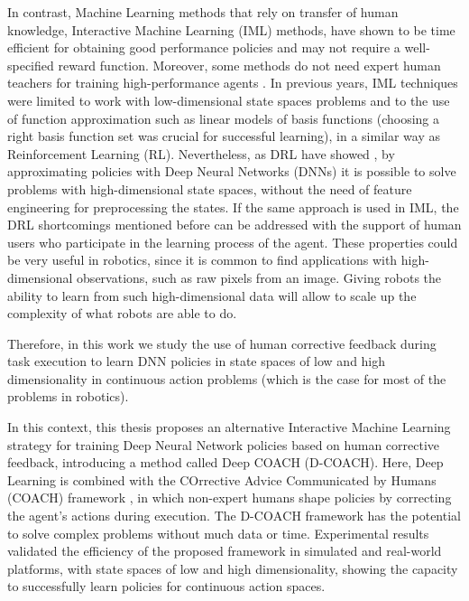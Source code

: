In contrast, Machine Learning methods that rely on transfer of human knowledge, Interactive Machine Learning (IML) methods, have shown to be time efficient for obtaining good performance policies and may not require a well-specified reward function. Moreover, some methods do not need expert human teachers for training high-performance agents \cite{akrour2011preference,Knox:2009:ISA:1597735.1597738,Celemin2018AnInteractive}. In previous years, IML techniques were limited to work with low-dimensional state spaces problems and to the use of function approximation such as linear models of basis functions (choosing a right basis function set was crucial for successful learning), in a similar way as Reinforcement Learning (RL). Nevertheless, as DRL have showed \cite{Mnih2015, Lillicrap2015}, by approximating policies with Deep Neural Networks (DNNs) it is possible to solve problems with high-dimensional state spaces, without the need of feature engineering for preprocessing the states. If the same approach is used in IML, the DRL shortcomings mentioned before can be addressed with the support of human users who participate in the learning process of the agent. These properties could be very useful in robotics, since it is common to find applications with high-dimensional observations, such as raw pixels from an image. Giving robots the ability to learn from such high-dimensional data will allow to scale up the complexity of what robots are able to do.

Therefore, in this work we study the use of human corrective feedback during task execution to learn DNN policies in state spaces of low and high dimensionality in continuous action problems (which is the case for most of the problems in robotics).

In this context, this thesis proposes an alternative Interactive Machine Learning strategy for training Deep Neural Network policies based on human corrective feedback, introducing a method called Deep COACH (D-COACH). Here, Deep Learning is combined with the COrrective Advice Communicated by Humans (COACH) framework \cite{Celemin2018AnInteractive}, in which non-expert humans shape policies by correcting the agent’s actions during execution. The $\text{D-COACH}$ framework has the potential to solve complex problems without much data or time. Experimental results validated the efficiency of the proposed framework in simulated and real-world platforms, with state spaces of low and high dimensionality, showing the capacity to successfully learn policies for continuous action spaces. 

